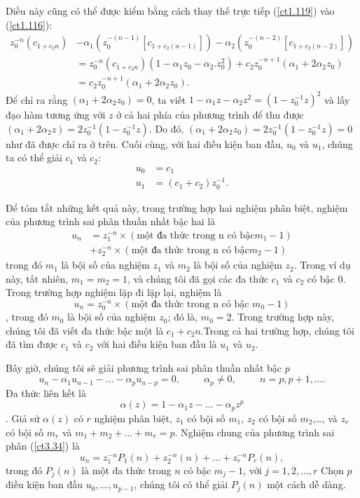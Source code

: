 \documentclass[12pt, a4paper,oneside]{book}
\theoremstyle{definition}
\begin{document}
Diều này cũng có thể được kiểm bằng cách thay thế trực tiếp (\ref{ct1.119}) vào (\ref{ct1.116}):
\begin{align*}
z_{0}^{-n} (c_{1 +c_{2}n})&- \alpha_{1}(z_{0}^{-(n-1)} [c_{1 + c_{2} (n-1)}]) - \alpha_{2}(z_{0}^{-(n-2)} [c_{1 + c_{2} (n-2)}])\\
&=z_{0}^{-n} (c_{1 +c_{2}n})(1-\alpha_{1}z_{0}-\alpha_{2}. z_{0}^{2}) + c_{2} z_{0}^{-n+1} (\alpha_{1}+2\alpha_{2}z_{0})\\
&=c_{2} z_{0}^{-n+1} (\alpha_{1}+2\alpha_{2}z_{0}).
\end{align*}
Để chỉ ra rằng $(\alpha_{1}+2\alpha_{2}z_{0})=0$, ta viết $ 1-\alpha_{1}z-\alpha_{2}z^{2}=(1-z_{0}^{-1}z)^{2}$ và lấy đạo hàm tương ứng với $z$ ở cả hai phía của phương trình để thu được $ (\alpha_{1}+2\alpha_{2}z)=2z_{0}^{-1} (1-z_{0}^{-1}z)$. Do đó, $(\alpha_{1}+2\alpha_{2}z_{0})=2z_{0}^{-1} (1-z_{0}^{-1}z)=0$ như đã được chỉ ra ở trên. Cuối cùng, với hai điều kiện ban đầu, $u_{0}$ và $u_{1}$, chúng ta có thể giải $c_{1}$ và $c_{2}$:
\begin{align*}
u_{0}&= c_{1}\\
u_{1}&=(c_{1}+ c_{2}) z_{0}^{-1}.
\end{align*}

Để tóm tắt những kết quả này, trong trường hợp hai nghiệm phân biệt, nghiệm của phương trình sai phân thuần nhất bậc hai là
\begin{align*}
u_{n}&= z_{1}^{-n}\times( \text{một đa thức trong n có bậc}  m_{1}-1) \\
& + z_{2}^{-n}\times( \text{một đa thức trong n có bậc}  m_{2}-1)
\end{align*}
trong đó $m_{1}$ là bội số của nghiệm $z_{1}$ và $m_{2}$ là bội số của nghiệm $z_{2}$. Trong ví dụ này, tất nhiên, $m_{1}=m_{2}=1$, và chúng tôi đã gọi các đa thức $c_{1}$ và $c_{2}$ có bậc $0$. Trong trường hợp nghiệm lặp đi lặp lại, nghiệm là
$$u_{n}= z_{0}^{-n}\times( \text{một đa thức trong n có bậc }  m_{0}-1)$$ ,
trong đó $m_{0}$ là bội số của nghiệm $z_{0}$; đó là, $m_{0}=2$. Trong trường hợp này, chúng tôi đã viết đa thức bậc một là $c_{1}+c_{2}n$.Trong cả hai trường hợp, chúng tôi đã tìm được $c_{1}$ và $c_{2}$ với hai điều kiện ban đầu là $u_{1}$ và $u_{2}$.	

Bây giờ, chúng tôi sẽ giải phương trình sai phân thuần nhất bậc $p$
\begin{equation}
	u_n-\alpha_1 u_{n-1}-\dots-\alpha_p u_{n-p}=0, \hspace{1cm}\alpha_p\neq 0, \hspace{1cm} n=p, p+1,\dots. \label{ct3.34}
\end{equation}
Đa thức liên kết là 
$$\alpha(z)=1-\alpha_1z-\dots-\alpha_pz^p$$.
Giả sử $\alpha(z)$ có $r$ nghiệm phân biệt, $z_1$ có bội số $m_1$, $z_2$ có bội số $m_2$,\dots, và $z_r$ có bội số $m_r$ và $m_1+m_2+\dots+m_r=p$. Nghiệm chung của phương trình sai phân (\ref{ct3.34}) là
\begin{equation}
	u_n=z_1^{-n}P_1(n)+z_2^{-n}(n)+\dots+z_r^{-n}P_r(n), 
\end{equation}
trong đó $P_j(n)$ là một đa thức trong $n$ có bậc $m_j-1$, với $j=1,2,\dots,r$ Chọn $p$ điều kiện ban đầu $u_0,\dots, u_{p-1}$, chúng tôi có thể giải $P_j(n)$ một cách dễ dàng.
\end{document}
